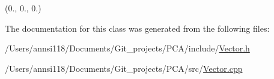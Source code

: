 (0., 0., 0.) 



The documentation for this class was generated from the following files\+:\begin{DoxyCompactItemize}
\item 
/\+Users/annsi118/\+Documents/\+Git\+\_\+projects/\+P\+C\+A/include/\hyperlink{_vector_8h}{Vector.\+h}\item 
/\+Users/annsi118/\+Documents/\+Git\+\_\+projects/\+P\+C\+A/src/\hyperlink{_vector_8cpp}{Vector.\+cpp}\end{DoxyCompactItemize}
